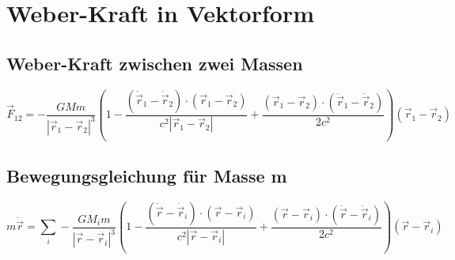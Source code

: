 \section{Weber-Kraft in Vektorform}
\subsection{Weber-Kraft zwischen zwei Massen}
\[
\vec{F}_{12} = -\frac{GMm}{|\vec{r}_1-\vec{r}_2|^3}\left(
1 - \frac{(\dot{\vec{r}}_1-\dot{\vec{r}}_2)\cdot(\vec{r}_1-\vec{r}_2)}{c^2|\vec{r}_1-\vec{r}_2|} + 
\frac{(\vec{r}_1-\vec{r}_2)\cdot(\ddot{\vec{r}}_1-\ddot{\vec{r}}_2)}{2c^2}
\right)(\vec{r}_1-\vec{r}_2)
\]

\subsection{Bewegungsgleichung für Masse m}
\[
m\ddot{\vec{r}} = \sum_{i} -\frac{GM_i m}{|\vec{r}-\vec{r}_i|^3}\left(
1 - \frac{(\dot{\vec{r}}-\dot{\vec{r}}_i)\cdot(\vec{r}-\vec{r}_i)}{c^2|\vec{r}-\vec{r}_i|} + 
\frac{(\vec{r}-\vec{r}_i)\cdot(\ddot{\vec{r}}-\ddot{\vec{r}}_i)}{2c^2}
\right)(\vec{r}-\vec{r}_i)
\]